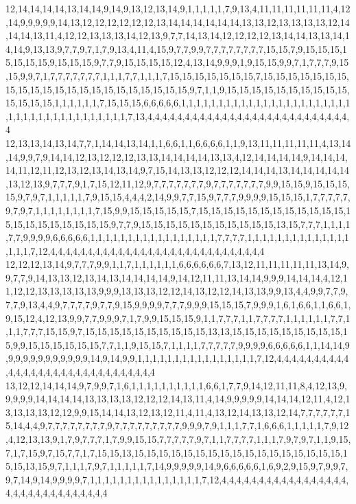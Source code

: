 12,14,14,14,14,13,14,14,9,14,9,13,12,13,14,9,1,1,1,1,1,7,9,13,4,11,11,11,11,11,11,4,12,14,9,9,9,9,9,14,13,12,12,12,12,12,12,13,14,14,14,14,14,14,13,13,12,13,13,13,13,12,14,14,14,13,11,4,12,12,13,13,13,14,12,13,9,7,7,14,13,14,12,12,12,12,13,14,14,13,13,14,14,14,9,13,13,9,7,7,9,7,1,7,9,13,4,11,4,15,9,7,7,9,9,7,7,7,7,7,7,7,7,15,15,7,9,15,15,15,15,15,15,15,9,15,15,15,9,7,7,9,15,15,15,15,12,4,13,14,9,9,9,1,9,15,15,9,9,7,1,7,7,7,9,15,15,9,9,7,1,7,7,7,7,7,7,7,1,1,1,7,7,1,1,1,7,15,15,15,15,15,15,15,7,15,15,15,15,15,15,15,15,15,15,15,15,15,15,15,15,15,15,15,15,15,15,9,7,1,1,9,15,15,15,15,15,15,15,15,15,15,15,15,15,15,1,1,1,1,1,1,7,15,15,15,6,6,6,6,6,1,1,1,1,1,1,1,1,1,1,1,1,1,1,1,1,1,1,1,1,1,1,1,1,1,1,1,1,1,1,1,1,1,1,1,1,1,1,1,7,13,4,4,4,4,4,4,4,4,4,4,4,4,4,4,4,4,4,4,4,4,4,4,4,4,4,4,4,4
12,13,13,14,13,14,7,7,1,14,14,13,14,1,1,6,6,1,1,6,6,6,6,1,1,9,13,11,11,11,11,11,4,13,14,14,9,9,7,9,14,14,12,13,12,12,12,13,13,14,14,14,14,13,13,4,12,14,14,14,14,9,14,14,14,14,11,12,11,12,13,12,13,14,13,14,9,7,15,14,13,13,12,12,12,14,14,14,13,14,14,14,14,14,13,12,13,9,7,7,7,9,1,7,15,12,11,12,9,7,7,7,7,7,7,7,9,7,7,7,7,7,7,7,9,9,15,15,9,15,15,15,15,9,7,9,7,1,1,1,1,1,7,9,15,15,4,4,4,2,14,9,9,7,7,15,9,7,7,7,9,9,9,9,15,15,15,1,7,7,7,7,7,9,7,9,7,1,1,1,1,1,1,1,1,7,15,9,9,15,15,15,15,15,7,15,15,15,15,15,15,15,15,15,15,15,15,15,15,15,15,15,15,15,15,15,9,7,7,9,15,15,15,15,15,15,15,15,15,15,15,13,15,7,7,7,1,1,1,1,7,7,9,9,9,9,6,6,6,6,6,1,1,1,1,1,1,1,1,1,1,1,1,1,1,1,1,1,7,7,7,7,1,1,1,1,1,1,1,1,1,1,1,1,1,1,1,1,1,7,12,4,4,4,4,4,4,4,4,4,4,4,4,4,4,4,4,4,4,4,4,4,4,4,4,4,4,4,4,4
12,12,12,13,14,9,7,7,7,9,9,1,1,7,1,1,1,1,1,1,6,6,6,6,6,6,7,13,12,11,11,11,11,11,13,14,9,9,7,7,9,14,13,13,12,13,14,13,14,14,14,14,9,14,12,11,11,13,14,14,9,9,9,14,14,14,4,12,11,12,12,13,13,13,13,13,9,9,9,13,13,13,12,12,14,13,12,12,14,13,13,9,9,13,4,4,9,9,7,7,9,7,7,9,13,4,4,9,7,7,7,7,9,7,7,9,15,9,9,9,9,7,7,7,9,9,9,15,15,15,7,9,9,9,1,6,1,6,6,1,1,6,6,1,9,15,12,4,12,13,9,9,7,7,9,9,9,7,1,7,9,9,15,15,15,9,1,1,7,7,7,1,1,7,7,7,7,1,1,1,1,1,1,7,7,1,1,1,7,7,7,15,15,9,7,15,15,15,15,15,15,15,15,15,15,13,13,15,15,15,15,15,15,15,15,15,15,9,9,15,15,15,15,15,15,7,7,1,1,9,15,15,7,1,1,1,1,7,7,7,7,7,9,9,9,9,6,6,6,6,6,1,1,14,14,9,9,9,9,9,9,9,9,9,9,9,9,14,9,14,9,9,1,1,1,1,1,1,1,1,1,1,1,1,1,1,1,1,7,12,4,4,4,4,4,4,4,4,4,4,4,4,4,4,4,4,4,4,4,4,4,4,4,4,4,4,4,4,4,4
13,12,12,14,14,14,9,7,9,9,7,1,6,1,1,1,1,1,1,1,1,1,1,6,6,1,7,7,9,14,12,11,11,8,4,12,13,9,9,9,9,9,14,14,14,14,13,13,13,13,12,12,12,14,13,11,4,14,9,9,9,9,9,14,14,14,12,11,4,12,13,13,13,13,12,12,9,9,15,14,14,13,12,13,12,11,4,11,4,13,12,14,13,13,12,14,7,7,7,7,7,7,15,14,4,4,9,7,7,7,7,7,7,7,7,9,7,7,7,7,7,7,7,7,7,9,9,9,7,9,1,1,1,7,7,1,6,6,6,1,1,1,1,1,7,9,12,4,12,13,13,9,1,7,9,7,7,7,1,7,9,9,15,15,7,7,7,7,7,9,7,1,1,7,7,7,7,1,1,1,7,9,7,9,7,1,1,9,15,7,1,7,15,9,7,15,7,7,1,7,15,15,13,15,15,15,15,15,15,15,15,15,15,15,15,15,15,15,15,15,15,15,13,15,9,7,1,1,1,7,9,7,1,1,1,1,1,7,14,9,9,9,9,9,14,9,6,6,6,6,6,1,6,9,2,9,15,9,7,9,9,7,9,7,14,9,14,9,9,9,9,7,1,1,1,1,1,1,1,1,1,1,1,1,1,1,1,7,12,4,4,4,4,4,4,4,4,4,4,4,4,4,4,4,4,4,4,4,4,4,4,4,4,4,4,4,4,4,4,4
